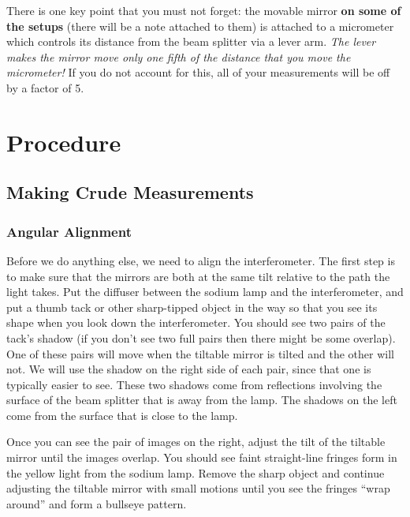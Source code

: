 \documentclass[]{manual}
\begin{document}
    \vspace{1cm}

    \noindent
    There is one key point that you must not forget: the movable mirror \textbf{on some of the setups} (there will be a note attached to them) is attached to a micrometer which controls its distance from the beam splitter via a lever arm.
    \textit{The lever makes the mirror move only one fifth of the distance that you move the micrometer!}
    If you do not account for this, all of your measurements will be off by a factor of 5.


    \FloatBarrier
    \newpage

    \section{Procedure}

    \subsection{Making Crude Measurements}

    \subsubsection{Angular Alignment}

    Before we do anything else, we need to align the interferometer.
    The first step is to make sure that the mirrors are both at the same tilt relative to the path the light takes.
    Put the diffuser between the sodium lamp and the interferometer, and put a thumb tack or other sharp-tipped object in the way so that you see its shape when you look down the interferometer.
    You should see two pairs of the tack's shadow (if you don't see two full pairs then there might be some overlap).
    One of these pairs will move when the tiltable mirror is tilted and the other will not.
    We will use the shadow on the right side of each pair, since that one is typically easier to see.
    These two shadows come from reflections involving the surface of the beam splitter that is away from the lamp.
    The shadows on the left come from the surface that is close to the lamp.

    Once you can see the pair of images on the right, adjust the tilt of the tiltable mirror until the images overlap.
    You should see faint straight-line fringes form in the yellow light from the sodium lamp.
    Remove the sharp object and continue adjusting the tiltable mirror with small motions until you see the fringes ``wrap around'' and form a bullseye pattern.
\end{document}
